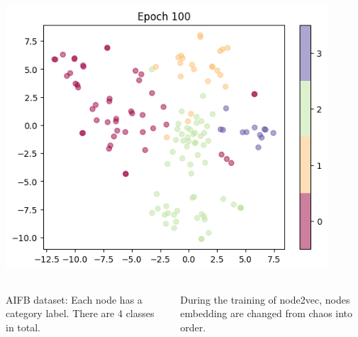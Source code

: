 \documentclass[notes, 10pt, aspectratio=169]{beamer}
\begin{document}
\begin{frame}
\begin{columns}
\begin{column}{0.33\textwidth}
           \includegraphics[width=0.9\textwidth]{./graphics/epoch100.png}
       \end{column}
   \end{columns} 
   \vspace{0.2cm}
   \begin{columns}
       \begin{column}{0.5\textwidth}
           AIFB dataset: Each node has a category label. There are 4 classes in total.
       \end{column}
       \begin{column}{0.5\textwidth}
           During the training of node2vec, nodes embedding are changed from chaos into order.
       \end{column}
   \end{columns}
\end{frame}
\end{document}
